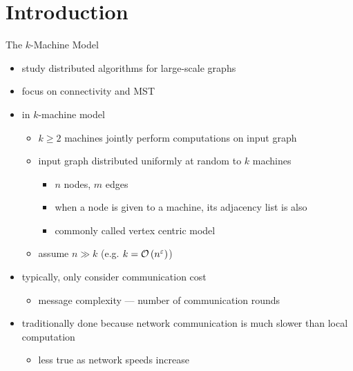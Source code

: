 \section{Introduction}
\begin{frame}{The $k$-Machine Model}
    \begin{itemize}
        \item study distributed algorithms for large-scale graphs
        \item focus on connectivity and MST
        \item in $k$-machine model
              \begin{itemize}
                  \item $k \geq 2$ machines jointly perform computations on input graph
                  \item input graph distributed uniformly at random to $k$ machines
                        \begin{itemize}
                            \item $n$ nodes, $m$ edges
                            \item when a node is given to a machine, its \alert{adjacency list} is also
                            \item commonly called \alert{vertex centric} model
                        \end{itemize}
                  \item assume $n \gg k$ (e.g. $k = \mathcal{O}\left(n^{\varepsilon}\right)$)
              \end{itemize}
        \item typically, \alert{only consider communication cost}
              \begin{itemize}
                  \item message complexity --- number of communication rounds
              \end{itemize}
        \item traditionally done because network communication is much slower
              than local computation
              \begin{itemize}
                  \item less true as network speeds increase
              \end{itemize}
    \end{itemize}
\end{frame}

